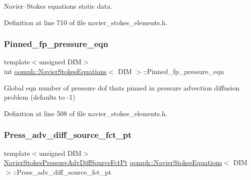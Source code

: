 Navier--Stokes equations static data. 

Definition at line 710 of file navier\+\_\+stokes\+\_\+elements.\+h.

\mbox{\label{classoomph_1_1NavierStokesEquations_aa167732c56b63dd094fea694d73cc75d}} 
\subsubsection{\texorpdfstring{Pinned\+\_\+fp\+\_\+pressure\+\_\+eqn}{Pinned\_fp\_pressure\_eqn}}
{\footnotesize\ttfamily template$<$unsigned D\+IM$>$ \\
int \hyperlink{classoomph_1_1NavierStokesEquations}{oomph\+::\+Navier\+Stokes\+Equations}$<$ D\+IM $>$\+::Pinned\+\_\+fp\+\_\+pressure\+\_\+eqn\hspace{0.3cm}{\ttfamily [protected]}}



Global eqn number of pressure dof that\textquotesingle{}s pinned in pressure advection diffusion problem (defaults to -\/1) 



Definition at line 508 of file navier\+\_\+stokes\+\_\+elements.\+h.

\mbox{\label{classoomph_1_1NavierStokesEquations_a4b50c799f9deafe43e5545deacfe9131}} 
\subsubsection{\texorpdfstring{Press\+\_\+adv\+\_\+diff\+\_\+source\+\_\+fct\+\_\+pt}{Press\_adv\_diff\_source\_fct\_pt}}
{\footnotesize\ttfamily template$<$unsigned D\+IM$>$ \\
\hyperlink{classoomph_1_1NavierStokesEquations_ae97e12328a88431038ccb321ee6d0c73}{Navier\+Stokes\+Pressure\+Adv\+Diff\+Source\+Fct\+Pt} \hyperlink{classoomph_1_1NavierStokesEquations}{oomph\+::\+Navier\+Stokes\+Equations}$<$ D\+IM $>$\+::Press\+\_\+adv\+\_\+diff\+\_\+source\+\_\+fct\+\_\+pt\hspace{0.3cm}{\ttfamily [protected]}}




